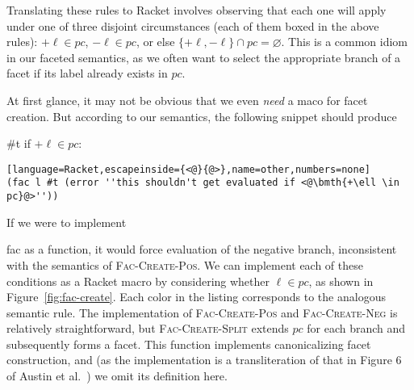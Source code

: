 \documentclass[review=true,acmlarge]{acmart}
\newcommand*{\SavedLstInline}{}
\DeclareRobustCommand*{\lstinline}{%
  \ifmmode
    \let\SavedBGroup\bgroup
    \def\bgroup{%
      \let\bgroup\SavedBGroup
      \hbox\bgroup
    }%
  \fi
  \SavedLstInline
}
\newcommand{\colorMATH}{black!20!blue}
\newcommand{\bmth}[1] {{\color{\colorMATH} $#1$}}
\newcommand{\code}[1]{\lstinline{#1}}
\begin{document}
Translating these rules to Racket involves observing that each one
will apply under one of three disjoint circumstances (each of them
boxed in the above rules): \bmth{+\ell \in pc}, \bmth{-\ell \in pc},
or else \bmth{\{+\ell,-\ell\} \cap pc = \varnothing}. This is a common
idiom in our faceted semantics, as we often want to select the
appropriate branch of a facet if its label already exists in
\bmth{pc}.

At first glance, it may not be obvious that we even \emph{need} a maco
for facet creation. But according to our semantics, the following
snippet should produce \code{#t} if \bmth{+\ell \in pc}:

\begin{lstlisting}[language=Racket,escapeinside={<@}{@>},name=other,numbers=none]
(fac l #t (error ''this shouldn't get evaluated if <@\bmth{+\ell \in pc}@>''))
\end{lstlisting}

If we were to implement \code{fac} as a function, it would force
evaluation of the negative branch, inconsistent with the semantics of
\textsc{Fac-Create-Pos}. We can implement each of these conditions as
a Racket macro by considering whether \bmth{\ell \in pc}, as shown in
Figure~\ref{fig:fac-create}. Each color in the listing corresponds to
the analogous semantic rule. The implementation of
\textsc{Fac-Create-Pos} and \textsc{Fac-Create-Neg} is relatively
straightforward, but \textsc{Fac-Create-Split} extends \bmth{pc} for
each branch and subsequently forms a facet. This function implements
canonicalizing facet construction, and (as the implementation is a
transliteration of that in Figure 6 of Austin et
al.~\cite{Austin:2012}) we omit its definition here.
\end{document}
